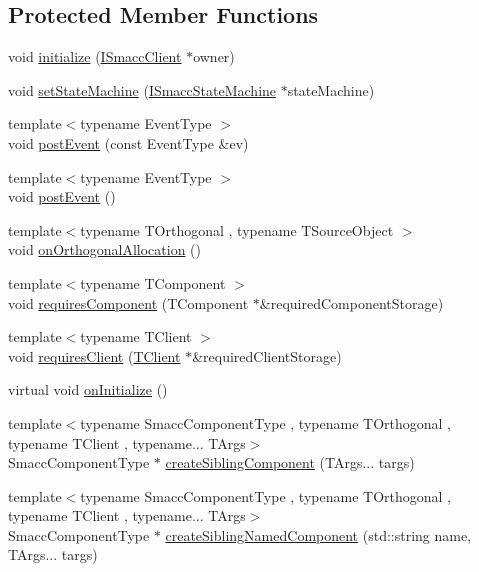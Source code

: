 \subsection*{Protected Member Functions}
\begin{DoxyCompactItemize}
\item 
void \hyperlink{classsmacc_1_1ISmaccComponent_a3378552cb1a86aa26a07c0edc057448b}{initialize} (\hyperlink{classsmacc_1_1ISmaccClient}{I\+Smacc\+Client} $\ast$owner)
\item 
void \hyperlink{classsmacc_1_1ISmaccComponent_afe57665a6982475e8f9c2a5885e986e1}{set\+State\+Machine} (\hyperlink{classsmacc_1_1ISmaccStateMachine}{I\+Smacc\+State\+Machine} $\ast$state\+Machine)
\item 
{\footnotesize template$<$typename Event\+Type $>$ }\\void \hyperlink{classsmacc_1_1ISmaccComponent_a687dead5b87a3b9781b9bf6ab0b7afa5}{post\+Event} (const Event\+Type \&ev)
\item 
{\footnotesize template$<$typename Event\+Type $>$ }\\void \hyperlink{classsmacc_1_1ISmaccComponent_a84455564c2c4b90be58e900050232722}{post\+Event} ()
\item 
{\footnotesize template$<$typename T\+Orthogonal , typename T\+Source\+Object $>$ }\\void \hyperlink{classsmacc_1_1ISmaccComponent_a709535b31a309e95a89ec3e4f4c54f30}{on\+Orthogonal\+Allocation} ()
\item 
{\footnotesize template$<$typename T\+Component $>$ }\\void \hyperlink{classsmacc_1_1ISmaccComponent_aa06d58b1dcec3c513ca2edddfd3847ec}{requires\+Component} (T\+Component $\ast$\&required\+Component\+Storage)
\item 
{\footnotesize template$<$typename T\+Client $>$ }\\void \hyperlink{classsmacc_1_1ISmaccComponent_a36c085d906fbae0fcaee817aaeafebf4}{requires\+Client} (\hyperlink{classTClient}{T\+Client} $\ast$\&required\+Client\+Storage)
\item 
virtual void \hyperlink{classsmacc_1_1ISmaccComponent_ae6f71d008db12553912e9436184b9e65}{on\+Initialize} ()
\item 
{\footnotesize template$<$typename Smacc\+Component\+Type , typename T\+Orthogonal , typename T\+Client , typename... T\+Args$>$ }\\Smacc\+Component\+Type $\ast$ \hyperlink{classsmacc_1_1ISmaccComponent_a85a3f70369d18176aa0a28c3ba31b945}{create\+Sibling\+Component} (T\+Args... targs)
\item 
{\footnotesize template$<$typename Smacc\+Component\+Type , typename T\+Orthogonal , typename T\+Client , typename... T\+Args$>$ }\\Smacc\+Component\+Type $\ast$ \hyperlink{classsmacc_1_1ISmaccComponent_a86afd97c9eaed89073def7c51a3c86ab}{create\+Sibling\+Named\+Component} (std\+::string name, T\+Args... targs)
\end{DoxyCompactItemize}
